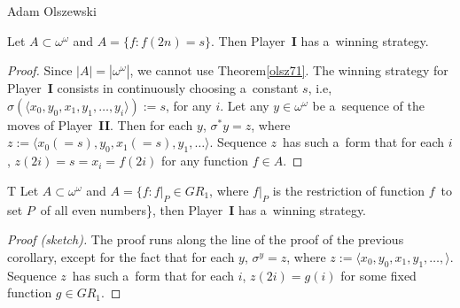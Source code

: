 \begin{artengenv}{Adam Olszewski}
\begin{proposition}
Let $A \subset \omega^{\omega}$ and $A = \{f: f(2n) = s\}$. Then Player~\textbf{I} has a~winning strategy.
\end{proposition}
\begin{proof}
Since $|A| = |\omega^{\omega}|$, we cannot use Theorem\ref{olsz71}. The winning strategy for Player~\textbf{I} consists in continuously choosing a~constant $s$, i.e, $\sigma (\langle x_{0}, y_{0}, x_{1}, y_{1}, \ldots, y_{i} \rangle) := s$, for any $i$. Let any $y\in\omega^{\omega}$ be a~sequence of the moves of Player~\textbf{II}. Then for each $y$, $\sigma^*y = z$, where $z := \langle x_{0}(=s), y_{0}, x_{1}(=s), y_{1}, \ldots \rangle$. Sequence $z$~has such a~form that for each $i$, $z(2i) = s = x_{i} = f(2i)$ for any function $f\in A$.
\end{proof}
%

\begin{customthm}{T}\label{olszT}
Let $A \subset \omega^{\omega}$ and $A = \{f: f |_{P} \in GR_{1}$, where $f |_{P}$ is the restriction of function $f$~to set $P$~of all even numbers\}, then Player~\textbf{I} has a~winning strategy.
\end{customthm}
\begin{proof}[Proof (sketch)]
The proof runs along the line of the proof of the previous corollary, except for the fact that for each $y$, $\sigma^y = z$, where $z := \langle x_{0}, y_{0}, x_{1}, y_{1}, \ldots, \rangle$. Sequence $z$~has such a~form that for each $i$, $z(2i) = g(i)$ for some fixed function $g \in GR_{1}$.
\end{proof}
%


\end{artengenv}
